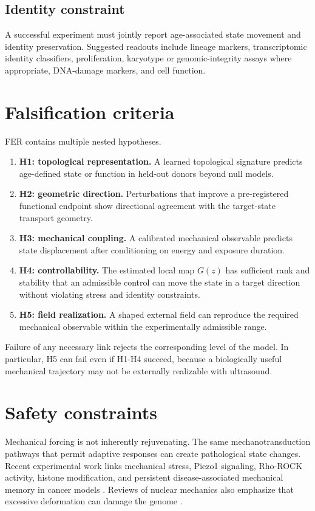 \documentclass[11pt]{article}
\begin{document}
\subsection{Identity constraint}
A successful experiment must jointly report age-associated state movement and identity preservation. Suggested readouts include lineage markers, transcriptomic identity classifiers, proliferation, karyotype or genomic-integrity assays where appropriate, DNA-damage markers, and cell function.

\section{Falsification criteria}
FER contains multiple nested hypotheses.
\begin{enumerate}[leftmargin=1.45em]
\item \textbf{H1: topological representation.} A learned topological signature predicts age-defined state or function in held-out donors beyond null models.
\item \textbf{H2: geometric direction.} Perturbations that improve a pre-registered functional endpoint show directional agreement with the target-state transport geometry.
\item \textbf{H3: mechanical coupling.} A calibrated mechanical observable predicts state displacement after conditioning on energy and exposure duration.
\item \textbf{H4: controllability.} The estimated local map $G(z)$ has sufficient rank and stability that an admissible control can move the state in a target direction without violating stress and identity constraints.
\item \textbf{H5: field realization.} A shaped external field can reproduce the required mechanical observable within the experimentally admissible range.
\end{enumerate}

Failure of any necessary link rejects the corresponding level of the model. In particular, H5 can fail even if H1-H4 succeed, because a biologically useful mechanical trajectory may not be externally realizable with ultrasound.

\section{Safety constraints}
Mechanical forcing is not inherently rejuvenating. The same mechanotransduction pathways that permit adaptive responses can create pathological state changes. Recent experimental work links mechanical stress, Piezo1 signaling, Rho-ROCK activity, histone modification, and persistent disease-associated mechanical memory in cancer models \cite{boyle2026}. Reviews of nuclear mechanics also emphasize that excessive deformation can damage the genome \cite{qiu2025,kloc2025}.
\end{document}
